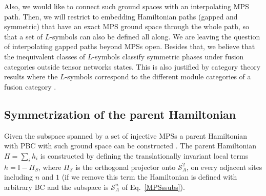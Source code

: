 \documentclass[a4paper,twocolumn,11pt,accepted=2023-02-10]{quantumarticle}
\newcommand{\id}{\mathbb{I}}
\begin{document}
Also, we would like to connect such ground spaces with an interpolating MPS path. Then, we will restrict to embedding Hamiltonian paths (gapped and symmetric) that have an exact MPS ground space through the whole path, so that a set of $L$-symbols can also be defined all along. We are leaving the question of interpolating gapped paths beyond MPSs open. Besides that, we believe that the inequivalent classes of $L$-symbols classify symmetric phases under fusion categories outside tensor networks states. This is also justified by category theory results where the $L$-symbols correspond to the different module categories of a fusion category \cite{etingof2003finite, Thorngren19}.

\subsection{Symmetrization of the parent Hamiltonian}

Given the subspace spanned by a set of injective MPSs a parent Hamiltonian with PBC with such ground space can be constructed \cite{PerezGarcia07}. The parent Hamiltonian $H=\sum_i h_i$ is constructed by defining the translationally invariant local terms $h = \id - \Pi_S$, where $\Pi_\mathcal{S}$ is the orthogonal projector onto $\mathcal{S}^2_A$, on every adjacent sites including $n$ and $1$ (if we remove this term the Hamiltonian is defined with arbitrary BC and the subspace is $\mathcal{S}_A^n$ of Eq.\ \eqref{MPSssubs}).
\end{document}
